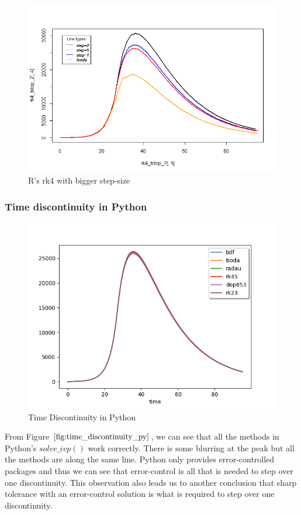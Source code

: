 \begin{figure}[h]
	\centering
	\includegraphics[width=0.7\linewidth]{./figures/rk4_messing_up_no_event_R}
	\caption{R's rk4 with bigger step-size}
	\label{fig:rk4_messing_up_no_event_R}
\end{figure}


\subsubsection{Time discontinuity in Python}
\begin{figure}[h]
	\centering
	\includegraphics[width=0.7\linewidth]{./figures/time_discontinuity_py}
	\caption{Time Discontinuity in Python}
	\label{fig:time_discontinuity_py}
\end{figure}
From Figure $\ref{fig:time_discontinuity_py}$, we can see that all the methods in Python's $solve\_ivp()$ work correctly. There is some blurring at the peak but all the methods are along the same line. Python only provides error-controlled packages and thus we can see that error-control is all that is needed to step over one discontinuity. This observation also leads us to another conclusion that sharp tolerance with an error-control solution is what is required to step over one discontinuity.

